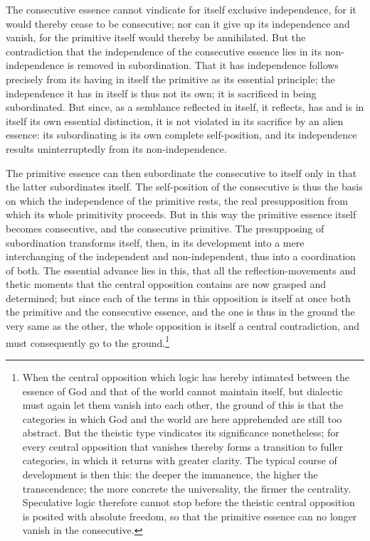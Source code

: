 \documentclass[12pt,a4paper,openany]{book}
\newcommand{\opage}[1]{\marginnote{\footnotesize\textit{[#1]}}}
\begin{document}
The consecutive essence cannot vindicate for itself
exclusive independence, for it would thereby
cease to be consecutive; nor can it give up
its independence and vanish, for the primitive itself
would thereby be annihilated. But the
contradiction that the independence of the consecutive essence
lies in its non-independence is removed in subordination.
That it has independence follows precisely
from its having in itself the primitive as its essential
principle; the independence it has in itself
is thus not its own; it is sacrificed in being subordinated.
But since, as a semblance reflected in itself,
it reflects, has and is in itself its own essential
distinction, it is not violated in its sacrifice
by an alien essence: its subordinating is
its own complete self-position, and its independence results uninterruptedly from its non-independence.

The primitive essence can then subordinate the
consecutive to itself only in that the latter subordinates
itself. The self-position of the consecutive is thus
the basis on which the independence of the primitive
rests, the real presupposition from which
its whole primitivity proceeds. But in this way
the primitive essence itself becomes consecutive, and the
consecutive primitive. The presupposing of subordination
transforms itself, then, in its development into a
mere interchanging of the independent and non-independent,
thus into a coordination of both. The
essential advance lies in this, that all the reflection-movements
and thetic moments that the
\setcounter{footnote}{0}%
\opage{124}central opposition contains are now grasped and determined;
but since each of the terms in this opposition
is itself at once both the primitive
and the consecutive essence, and the one is thus in the ground
the very same as the other, the
whole opposition is itself a central contradiction, and
must consequently go to the ground.\footnote{When the central opposition which logic has hereby intimated between the essence of God and that of the world cannot maintain itself, but dialectic must again let them vanish into each other, the ground of this is that the categories in which God and the world are here apprehended are still too abstract. But the theistic type vindicates its significance nonetheless; for every central opposition that vanishes thereby forms a transition to fuller categories, in which it returns with greater clarity. The typical course of development is then this: the deeper the immanence, the higher the transcendence; the more concrete the universality, the firmer the centrality. Speculative logic therefore cannot stop before the theistic central opposition is posited with absolute freedom, so that the primitive essence can no longer vanish in the consecutive.}
\end{document}
